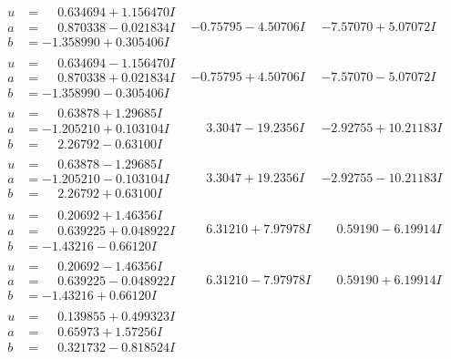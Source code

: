 \documentclass[1p]{elsarticle_modified}
\theoremstyle{definition}
\begin{document}
$$\begin{array}{c|c|c}
\begin{aligned}
u &= \phantom{-}0.634694 + 1.156470 I \\
a &= \phantom{-}0.870338 - 0.021834 I \\
b &= -1.358990 + 0.305406 I\end{aligned}
 & -0.75795 - 4.50706 I & -7.57070 + 5.07072 I \\ \hline\begin{aligned}
u &= \phantom{-}0.634694 - 1.156470 I \\
a &= \phantom{-}0.870338 + 0.021834 I \\
b &= -1.358990 - 0.305406 I\end{aligned}
 & -0.75795 + 4.50706 I & -7.57070 - 5.07072 I \\ \hline\begin{aligned}
u &= \phantom{-}0.63878 + 1.29685 I \\
a &= -1.205210 + 0.103104 I \\
b &= \phantom{-}2.26792 - 0.63100 I\end{aligned}
 & \phantom{-}3.3047 - 19.2356 I & -2.92755 + 10.21183 I \\ \hline\begin{aligned}
u &= \phantom{-}0.63878 - 1.29685 I \\
a &= -1.205210 - 0.103104 I \\
b &= \phantom{-}2.26792 + 0.63100 I\end{aligned}
 & \phantom{-}3.3047 + 19.2356 I & -2.92755 - 10.21183 I \\ \hline\begin{aligned}
u &= \phantom{-}0.20692 + 1.46356 I \\
a &= \phantom{-}0.639225 + 0.048922 I \\
b &= -1.43216 - 0.66120 I\end{aligned}
 & \phantom{-}6.31210 + 7.97978 I & \phantom{-}0.59190 - 6.19914 I \\ \hline\begin{aligned}
u &= \phantom{-}0.20692 - 1.46356 I \\
a &= \phantom{-}0.639225 - 0.048922 I \\
b &= -1.43216 + 0.66120 I\end{aligned}
 & \phantom{-}6.31210 - 7.97978 I & \phantom{-}0.59190 + 6.19914 I \\ \hline\begin{aligned}
u &= \phantom{-}0.139855 + 0.499323 I \\
a &= \phantom{-}0.65973 + 1.57256 I \\
b &= \phantom{-}0.321732 - 0.818524 I\end{aligned}

\end{array}$$
\end{document}
